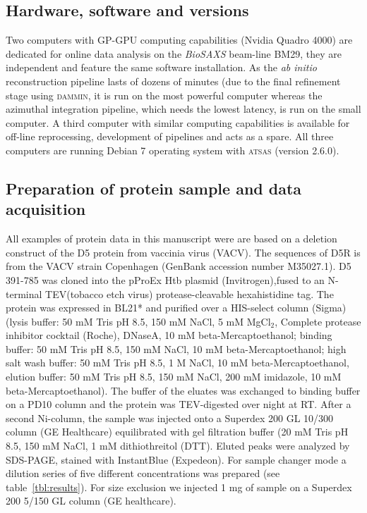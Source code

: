 \documentclass[preprint,pdf]{iucr}              %
\begin{document}
\subsection{Hardware, software and versions}
Two computers with GP-GPU computing capabilities (Nvidia Quadro 4000) are
dedicated for online data analysis on the \textit{BioSAXS} beam-line BM29, they are
independent and feature the same software installation.
As the \textit{ab initio} reconstruction pipeline lasts of dozens of minutes
(due to the final refinement stage using \textsc{dammin}, it is run on the most powerful
computer whereas the azimuthal integration pipeline, which needs the lowest
latency, is run on the small computer.
A third computer with similar computing capabilities is available for
off-line reprocessing, development of pipelines and acts as a spare.
All three computers are running Debian 7 operating system with \textsc{atsas}
(version 2.6.0).


\subsection{Preparation of protein sample and data acquisition}
All examples of protein data in this manuscript were are based on a deletion construct of 
the D5 protein from vaccinia virus (VACV).
The sequences of D5R is from the VACV strain Copenhagen (GenBank accession number M35027.1). 
D5 391-785 was cloned into the pProEx Htb plasmid (Invitrogen),fused to an N-terminal 
TEV(tobacco etch virus) protease-cleavable hexahistidine tag. The protein was expressed in 
BL21* and purified over a HIS-select column (Sigma) (lysis buffer: 50 mM Tris pH 8.5, 150 mM NaCl, 
5 mM MgCl$_{2}$, Complete protease inhibitor cocktail (Roche), DNaseA, 10 mM beta-Mercaptoethanol; binding buffer: 50 mM Tris pH 8.5, 150 mM NaCl, 10 mM beta-Mercaptoethanol; high salt wash buffer: 50 mM Tris pH 8.5, 1 M NaCl, 10 mM beta-Mercaptoethanol, elution buffer: 50 mM Tris pH 8.5, 150 mM NaCl,  200 mM imidazole, 10 mM beta-Mercaptoethanol). The buffer of the eluates was exchanged to binding buffer on a PD10 column and the protein was TEV-digested over night at RT. After a second Ni-column, the sample was injected onto a Superdex 200 GL 10/300 column (GE Healthcare) equilibrated with gel filtration buffer (20 mM Tris pH 8.5, 150 mM NaCl, 1 mM dithiothreitol (DTT). Eluted peaks were analyzed by SDS-PAGE, stained with InstantBlue (Expedeon).  
For sample changer mode a dilution series of five different concentrations was prepared 
(see table~\ref{tbl:results}). For size exclusion we injected 1 mg of sample on a Superdex 
200 5/150 GL column (GE healthcare).
\end{document}
